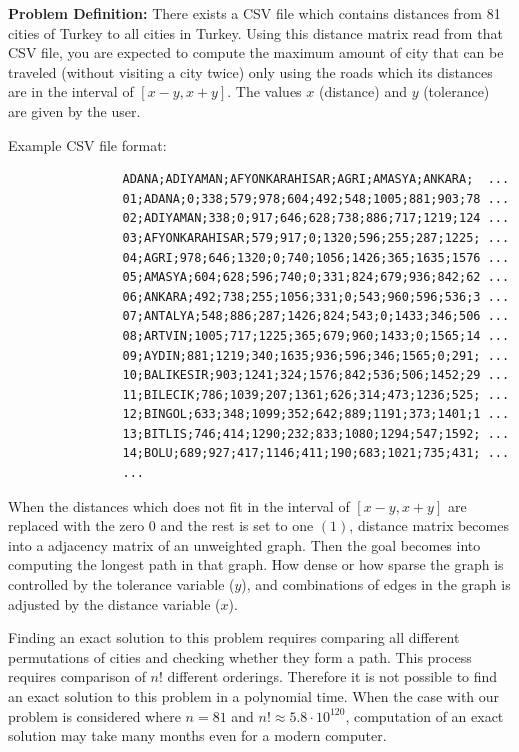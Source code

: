\documentclass[12pt]{report}
\begin{document}
            \textbf{Problem Definition:} There exists a CSV file which contains distances from 81 cities of Turkey to all cities in Turkey. 
            Using this distance matrix read from that CSV file, you are expected to compute the maximum amount of city that can be traveled 
            (without visiting a city twice) only using the roads which its distances are in the interval of $[x-y, x+y]$. The values $x$ (distance) and $y$ (tolerance) 
            are given by the user.
            \newline

            Example CSV file format:

            \begin{verbatim}
                ADANA;ADIYAMAN;AFYONKARAHISAR;AGRI;AMASYA;ANKARA;  ...
                01;ADANA;0;338;579;978;604;492;548;1005;881;903;78 ...
                02;ADIYAMAN;338;0;917;646;628;738;886;717;1219;124 ...
                03;AFYONKARAHISAR;579;917;0;1320;596;255;287;1225; ...
                04;AGRI;978;646;1320;0;740;1056;1426;365;1635;1576 ...
                05;AMASYA;604;628;596;740;0;331;824;679;936;842;62 ...
                06;ANKARA;492;738;255;1056;331;0;543;960;596;536;3 ...
                07;ANTALYA;548;886;287;1426;824;543;0;1433;346;506 ...
                08;ARTVIN;1005;717;1225;365;679;960;1433;0;1565;14 ...
                09;AYDIN;881;1219;340;1635;936;596;346;1565;0;291; ...
                10;BALIKESIR;903;1241;324;1576;842;536;506;1452;29 ...
                11;BILECIK;786;1039;207;1361;626;314;473;1236;525; ...
                12;BINGOL;633;348;1099;352;642;889;1191;373;1401;1 ...
                13;BITLIS;746;414;1290;232;833;1080;1294;547;1592; ...
                14;BOLU;689;927;417;1146;411;190;683;1021;735;431; ...
                ...
            \end{verbatim}

            When the distances which does not fit in the interval of $[x-y, x+y]$ are replaced with the zero $0$ and the rest is set to one $(1)$, distance matrix becomes into a 
            adjacency matrix of an unweighted graph. Then the goal becomes into computing the longest path in that graph. How dense or how sparse the graph is controlled by the 
            tolerance variable ($y$), and combinations of edges in the graph is adjusted by the distance variable ($x$).
            
            Finding an exact solution to this problem requires comparing all different 
            permutations of cities and checking whether they form a path. This process requires comparison of $n!$ different orderings. Therefore it is not possible
            to find an exact solution to this problem in a polynomial time. When the case with our problem is considered where $n=81$ and $n! \approx 5.8\cdot 10^{120}$,
            computation of an exact solution may take many months even for a modern computer.
\end{document}
